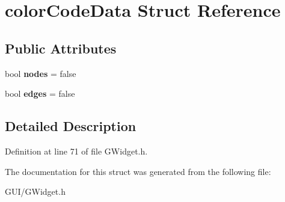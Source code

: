 \hypertarget{structcolor_code_data}{}\section{color\+Code\+Data Struct Reference}
\label{structcolor_code_data}
\subsection*{Public Attributes}
\begin{DoxyCompactItemize}
\item 
\mbox{\label{structcolor_code_data_a6ae043ff989d0240a51b121f73a43276}} 
bool {\bfseries nodes} = false
\item 
\mbox{\label{structcolor_code_data_afd458039194f9472f3b4dc49d6cddbe6}} 
bool {\bfseries edges} = false
\end{DoxyCompactItemize}


\subsection{Detailed Description}


Definition at line 71 of file G\+Widget.\+h.



The documentation for this struct was generated from the following file\+:\begin{DoxyCompactItemize}
\item 
G\+U\+I/G\+Widget.\+h\end{DoxyCompactItemize}

